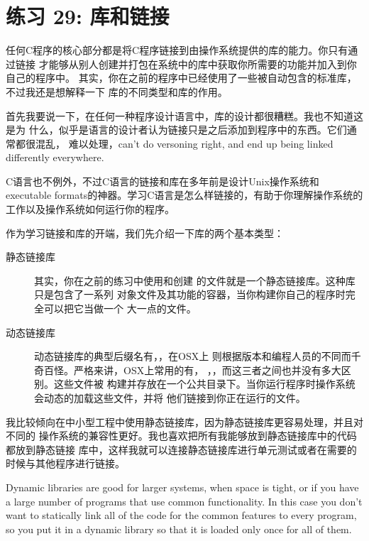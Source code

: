 \chapter{练习 29: 库和链接}

任何C程序的核心部分都是将C程序链接到由操作系统提供的库的能力。你只有通过链接
才能够从别人创建并打包在系统中的库中获取你所需要的功能并加入到你自己的程序中。
其实，你在之前的程序中已经使用了一些被自动包含的标准库，不过我还是想解释一下
库的不同类型和库的作用。

首先我要说一下，在任何一种程序设计语言中，库的设计都很糟糕。我也不知道这是为
什么，似乎是语言的设计者认为链接只是之后添加到程序中的东西。它们通常都很混乱，
难以处理，can't do versoning right, and end up being linked differently everywhere.

C语言也不例外，不过C语言的链接和库在多年前是设计Unix操作系统和executable
formats的神器。学习C语言是怎么样链接的，有助于你理解操作系统的工作以及操作系统如何运行你的程序。

作为学习链接和库的开端，我们先介绍一下库的两个基本类型：

\begin{description}
\item[静态链接库] 其实，你在之前的练习中使用和创建
    的文件就是一个静态链接库。这种库只是包含了一系列
    对象文件及其功能的容器，当你构建你自己的程序时完全可以把它当做一个
    大一点的文件。
\item[动态链接库] 动态链接库的典型后缀名有，，在OSX上
    则根据版本和编程人员的不同而千奇百怪。严格来讲，OSX上常用的有，
    ，，而这三者之间也并没有多大区别。这些文件被
    构建并存放在一个公共目录下。当你运行程序时操作系统会动态的加载这些文件，并将
    他们链接到你正在运行的文件。
\end{description}

我比较倾向在中小型工程中使用静态链接库，因为静态链接库更容易处理，并且对不同的
操作系统的兼容性更好。我也喜欢把所有我能够放到静态链接库中的代码都放到静态链接
库中，这样我就可以连接静态链接库进行单元测试或者在需要的时候与其他程序进行链接。

Dynamic libraries are good for larger systems, when space is tight, or if you have
a large number of programs that use common functionality.  In this case you don't
want to statically link all of the code for the common features to every program,
so you put it in a dynamic library so that it is loaded only once for all of them.


